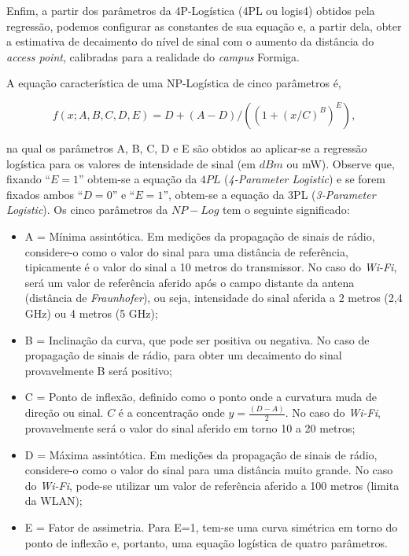 \documentclass[
	12pt,				%
	twoside,			%
	a4paper,			%
	english,			%
	french,				%
	spanish,			%
	brazil				%
	]{abntex2}
\begin{document}
\clearpage

Enfim, a partir dos parâmetros da 4P-Logística (4PL ou logis4) obtidos
pela regressão, podemos configurar as constantes de sua equação e, a
partir dela, obter a estimativa de decaimento do nível de sinal com o
aumento da distância do \emph{access point}, calibradas para a realidade
do \emph{campus} Formiga.

A equação característica de uma NP-Logística de cinco parâmetros é,

\begin{equation}
    f(x; A,B,C,D,E) = D + (A-D) / ( (1+(x/C)^B)^E ),
\end{equation}

\noindent na qual os parâmetros A, B, C, D e E são obtidos ao aplicar-se
a regressão logística para os valores de intensidade de sinal (em
\(dBm\) ou mW). Observe que, fixando ``\(E=1\)'' obtem-se a equação da
\(4PL\) (\emph{4-Parameter Logistic}) e se forem fixados ambos
``\(D=0\)'' e ``\(E=1\)'', obtem-se a equação da 3PL (\emph{3-Parameter
Logistic}). Os cinco parâmetros da \(NP-Log\) tem o seguinte
significado:

\begin{itemize}
\item
  A = Mínima assintótica. Em medições da propagação de sinais de rádio,
  considere-o como o valor do sinal para uma distância de referência,
  tipicamente é o valor do sinal a 10 metros do transmissor. No caso do
  \emph{Wi-Fi}, será um valor de referência aferido após o campo
  distante da antena (distância de \emph{Fraunhofer}), ou seja,
  intensidade do sinal aferida a 2 metros (2,4 GHz) ou 4 metros (5 GHz);
\item
  B = Inclinação da curva, que pode ser positiva ou negativa. No caso de
  propagação de sinais de rádio, para obter um decaimento do sinal
  provavelmente B será positivo;
\item
  C = Ponto de inflexão, definido como o ponto onde a curvatura muda de
  direção ou sinal. \(C\) é a concentração onde \(y = \frac{(D-A)}{2}\).
  No caso do \emph{Wi-Fi}, provavelmente será o valor do sinal aferido
  em torno 10 a 20 metros;
\item
  D = Máxima assintótica. Em medições da propagação de sinais de rádio,
  considere-o como o valor do sinal para uma distância muito grande. No
  caso do \emph{Wi-Fi}, pode-se utilizar um valor de referência aferido
  a 100 metros (limita da WLAN);
\item
  E = Fator de assimetria. Para E=1, tem-se uma curva simétrica em torno
  do ponto de inflexão e, portanto, uma equação logística de quatro
  parâmetros.
\end{itemize}
\end{document}
